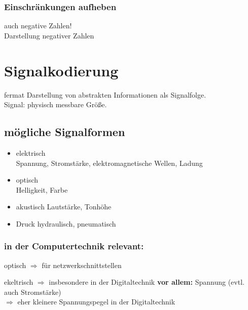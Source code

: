 \documentclass[10pt,a4paper]{scrartcl}
\begin{document}
\subsubsection*{Einschränkungen aufheben}
\hspace*{2em}
auch negative Zahlen!
\\
Darstellung negativer Zahlen



\section{Signalkodierung}

\begin{Theorem}{}{fermat}
	Darstellung von abstrakten Informationen als Signalfolge. \\
	Signal: physisch messbare Größe.
\end{Theorem}

\subsection{mögliche Signalformen}
\begin{itemize}
	\renewcommand\labelitemi{--}
	
	\item elektrisch\\
		Spannung, Stromstärke, elektromagnetische Wellen, Ladung
	\item optisch\\
		Helligkeit, Farbe
	\item akustisch
		Lautstärke, Tonhöhe
	\item Druck
		hydraulisch, pneumatisch
\end{itemize}

\subsubsection*{in der Computertechnik relevant:}

\begin{list}{}{}
	\item[] optisch $\Rightarrow$ für netzwerkschnittstellen
	\item ekeltrisch $\Rightarrow$ insbesondere in der Digitaltechnik
	\subitem \textbf{vor allem:} Spannung (evtl. auch Stromstärke)\\
	\hspace*{2em}$\Rightarrow$ eher kleinere Spannungspegel in der Digitaltechnik
\end{list}
\end{document}
